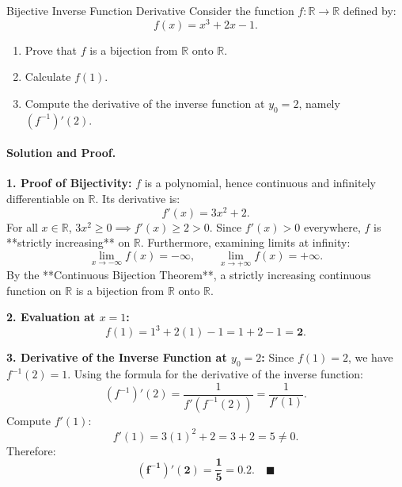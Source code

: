 \begin{workedexample}{Bijective Inverse Function Derivative}
Consider the function $f: \mathbb{R} \longrightarrow \mathbb{R}$ defined by:
\[
f(x) = x^3 + 2x - 1.
\]
\begin{enumerate}[leftmargin=1.4em,itemsep=2pt]
  \item Prove that $f$ is a bijection from $\mathbb{R}$ onto $\mathbb{R}$.
  \item Calculate $f(1)$.
  \item Compute the derivative of the inverse function at $y_0 = 2$, namely $(f^{-1})'(2)$.
\end{enumerate}

\paragraph{Solution and Proof.}
\textbf{1. Proof of Bijectivity:}
$f$ is a polynomial, hence continuous and infinitely differentiable on $\mathbb{R}$.
Its derivative is:
\[
f'(x) = 3x^2 + 2.
\]
For all $x \in \mathbb{R}$, $3x^2 \ge 0 \implies f'(x) \ge 2 > 0$.
Since $f'(x) > 0$ everywhere, $f$ is **strictly increasing** on $\mathbb{R}$.
Furthermore, examining limits at infinity:
\[
\lim_{x \to -\infty} f(x) = -\infty, \qquad \lim_{x \to +\infty} f(x) = +\infty.
\]
By the **Continuous Bijection Theorem**, a strictly increasing continuous function on $\mathbb{R}$ is a bijection from $\mathbb{R}$ onto $\mathbb{R}$.

\textbf{2. Evaluation at $x = 1$:}
\[
f(1) = 1^3 + 2(1) - 1 = 1 + 2 - 1 = \mathbf{2}.
\]

\textbf{3. Derivative of the Inverse Function at $y_0 = 2$:}
Since $f(1) = 2$, we have $f^{-1}(2) = 1$.
Using the formula for the derivative of the inverse function:
\[
(f^{-1})'(2) = \frac{1}{f'(f^{-1}(2))} = \frac{1}{f'(1)}.
\]
Compute $f'(1)$:
\[
f'(1) = 3(1)^2 + 2 = 3 + 2 = 5 \neq 0.
\]
Therefore:
\[
\mathbf{(f^{-1})'(2) = \frac{1}{5} = 0.2}. \quad \blacksquare
\]
\end{workedexample}
